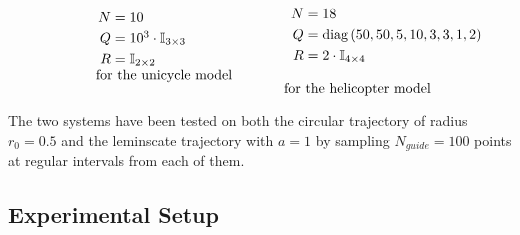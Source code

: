 \documentclass[../main.tex]{subfiles}
\begin{document}
\[
\begin{minipage}{.2\textwidth}
\end{minipage}%
\begin{minipage}{.3\textwidth}
  $\begin{array}{r@{{}\mathrel{=}{}}l}
	  N & 10 \\[\jot]
	  Q & 10^3 \cdot \mbb{I}_{3 \times 3} \\[\jot]
	  R & \mbb{I}_{2 \times 2}
  \end{array}$\\
	\vspace{0.25cm}
  \text{for the unicycle model}
\end{minipage}%
\begin{minipage}{.10\textwidth}
\quad
\end{minipage}%
\begin{minipage}{.3\textwidth}
  $\begin{array}{r@{{}\mathrel{=}{}}l}
	N & 18 \\[\jot] 
	Q & \text{diag}\left(50, 50, 5, 10, 3, 3, 1, 2\right) \\[\jot]
	R & 2 \cdot \mbb{I}_{4 \times 4}
  \end{array}$\\
  \vspace{0.25cm}
  \text{for the helicopter model}
\end{minipage}%
\]

The two systems have been tested on both the circular trajectory of radius $r_0
= 0.5$ and the leminscate trajectory with $a = 1$ by sampling $N_{guide} = 100$
points at regular intervals from each of them.

\subsection{Experimental Setup}
\end{document}
